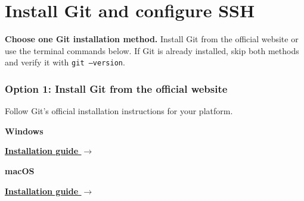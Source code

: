 \chapter{Install Git and configure SSH}
\label{ch:git-ssh-setup}

\noindent\textbf{Choose one Git installation method.} Install Git from the official website or use the terminal commands below. If Git is already installed, skip both methods and verify it with \texttt{git --version}.

\subsection{Option 1: Install Git from the official website}

\begin{tcolorbox}[
  enhanced,
  colback=white,
  colframe=UTPBlue!28,
  colbacktitle=UTPNavy,
  boxrule=0.65pt,
  arc=2mm,
  title={Choose your operating system},
  fonttitle=\bfseries\color{white},
  left=3.5mm,right=3.5mm,top=2.5mm,bottom=2.5mm
]
{\small\color{UTPMuted}Follow Git's official installation instructions for your platform.}\par\smallskip
\noindent
\begin{minipage}[t]{0.32\linewidth}
  \begin{tcolorbox}[enhanced,width=\linewidth,height=2.8cm,valign=center,colback=UTPPaleBlue!35,colframe=UTPBlue!30,boxrule=0.55pt,arc=1.5mm,left=1mm,right=1mm,top=1.5mm,bottom=1.5mm]
    \centering
    {\fontsize{23}{25}\selectfont\color{UTPBlue}\faWindows}\par\smallskip
    {\large\bfseries\color{UTPNavy}Windows}\par\smallskip
    \href{https://git-scm.com/install/windows}{\textbf{\small\color{UTPBlue}Installation guide $\rightarrow$}}
  \end{tcolorbox}
\end{minipage}\hfill
\begin{minipage}[t]{0.32\linewidth}
  \begin{tcolorbox}[enhanced,width=\linewidth,height=2.8cm,valign=center,colback=UTPPaleBlue!35,colframe=UTPBlue!30,boxrule=0.55pt,arc=1.5mm,left=1mm,right=1mm,top=1.5mm,bottom=1.5mm]
    \centering
    {\fontsize{23}{25}\selectfont\color{UTPBlue}\faApple}\par\smallskip
    {\large\bfseries\color{UTPNavy}macOS}\par\smallskip
    \href{https://git-scm.com/install/mac}{\textbf{\small\color{UTPBlue}Installation guide $\rightarrow$}}

\end{tcolorbox}
\end{minipage}
\end{tcolorbox}

